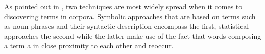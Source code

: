 %
As pointed out in \textcite{Hu.2004}, two techniques are most widely spread when it comes to discovering terms in corpora. Symbolic approaches that are based on terms such as noun phrases and their syntactic description encompass the first, statistical approaches the second while the latter make use of the fact that words composing a term a in close proximity to each other and reoccur. 

